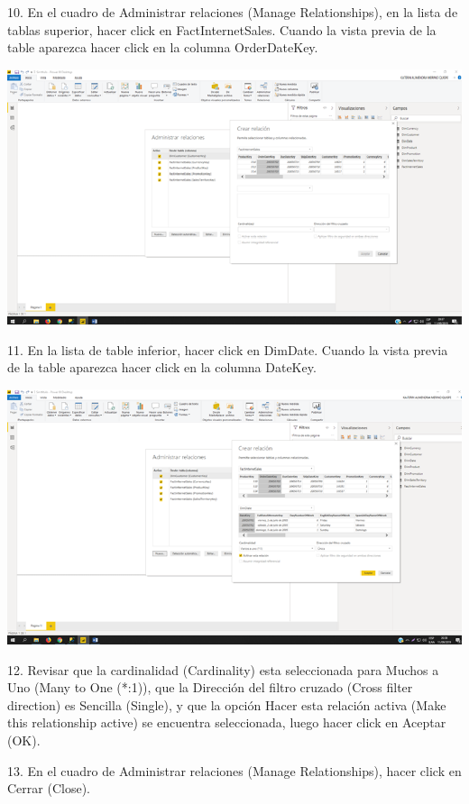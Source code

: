 \item 10. En el cuadro de Administrar relaciones (Manage Relationships), en la lista de tablas superior, hacer click en FactInternetSales. Cuando la vista previa de la table aparezca hacer click en la columna
OrderDateKey.

\begin{center}
\includegraphics[width=15cm]{./Imagenes/img06} 
\end{center}

\item 11. En la lista de table inferior, hacer click en DimDate. Cuando la vista previa de la table aparezca hacer click en la columna DateKey. 

\begin{center}
\includegraphics[width=15cm]{./Imagenes/img07} 
\end{center}

\item 12. Revisar que la cardinalidad (Cardinality) esta seleccionada para Muchos a Uno (Many to One (*:1)), que la Dirección del filtro cruzado (Cross filter direction) es Sencilla (Single), y que la opción Hacer esta relación activa (Make this relationship active) se encuentra seleccionada, luego hacer click en Aceptar (OK).
\item 13. En el cuadro de Administrar relaciones (Manage Relationships), hacer click en Cerrar (Close).

